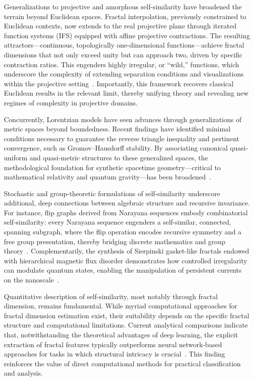 Generalizations to projective and amorphous self-similarity have broadened the terrain beyond Euclidean spaces. Fractal interpolation, previously constrained to Euclidean contexts, now extends to the real projective plane through iterated function systems (IFS) equipped with affine projective contractions. The resulting attractors—continuous, topologically one-dimensional functions—achieve fractal dimensions that not only exceed unity but can approach two, driven by specific contraction ratios. This engenders highly irregular, or ``wild,'' functions, which underscore the complexity of extending separation conditions and visualizations within the projective setting~\cite{ref30}. Importantly, this framework recovers classical Euclidean results in the relevant limit, thereby unifying theory and revealing new regimes of complexity in projective domains.

Concurrently, Lorentzian models have seen advances through generalizations of metric spaces beyond boundedness. Recent findings have identified minimal conditions necessary to guarantee the reverse triangle inequality and pertinent convergence, such as Gromov--Hausdorff stability. By associating canonical quasi-uniform and quasi-metric structures to these generalized spaces, the methodological foundation for synthetic spacetime geometry—critical to mathematical relativity and quantum gravity—has been broadened~\cite{ref33}.

Stochastic and group-theoretic formulations of self-similarity underscore additional, deep connections between algebraic structure and recursive invariance. For instance, flip graphs derived from Narayana sequences embody combinatorial self-similarity: every Narayana sequence engenders a self-similar, connected, spanning subgraph, where the flip operation encodes recursive symmetry and a free group presentation, thereby bridging discrete mathematics and group theory~\cite{ref42}. Complementarily, the synthesis of Sierpinski gasket-like fractals endowed with hierarchical magnetic flux disorder demonstrates how controlled irregularity can modulate quantum states, enabling the manipulation of persistent currents on the nanoscale~\cite{ref51}.

Quantitative description of self-similarity, most notably through fractal dimension, remains fundamental. While myriad computational approaches for fractal dimension estimation exist, their suitability depends on the specific fractal structure and computational limitations. Current analytical comparisons indicate that, notwithstanding the theoretical advantages of deep learning, the explicit extraction of fractal features typically outperforms neural network-based approaches for tasks in which structural intricacy is crucial~\cite{ref37}. This finding reinforces the value of direct computational methods for practical classification and analysis.

